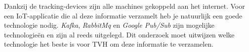 Dankzij de tracking-devices zijn alle machines gekoppeld aan het internet. Voor een IoT-applicatie die al deze informatie verzamelt heb je natuurlijk een goede technologie nodig. \emph{Kafka}, \emph{RabbitMq} en \emph{Google Pub/Sub} zijn mogelijke technologieën en zijn al reeds uitgelegd. Dit onderzoek moet uitwijzen welke technologie het beste is voor TVH om deze informatie te verzamelen.



